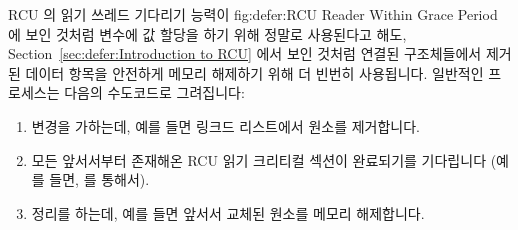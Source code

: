 RCU 의 읽기 쓰레드 기다리기 능력이
{fig:defer:RCU Reader Within Grace Period}
에 보인 것처럼 변수에 값 할당을 하기 위해 정말로 사용된다고 해도,
Section~\ref{sec:defer:Introduction to RCU} 에서 보인 것처럼 연결된
구조체들에서 제거된 데이터 항목을 안전하게 메모리 해제하기 위해 더 빈번히
사용됩니다.
일반적인 프로세스는 다음의 수도코드로 그려집니다:

\begin{enumerate}
\item	변경을 가하는데, 예를 들면 링크드 리스트에서 원소를 제거합니다.
\item	모든 앞서서부터 존재해온 RCU 읽기 크리티컬 섹션이 완료되기를 기다립니다
	(예를 들면,  를 통해서).
\item	정리를 하는데, 예를 들면 앞서서 교체된 원소를 메모리 해제합니다.
\end{enumerate}

